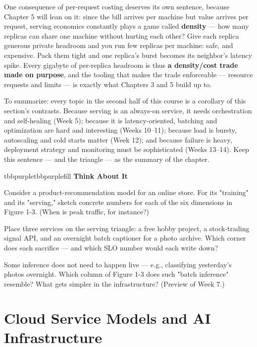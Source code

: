 One consequence of per-request costing deserves its own sentence, because Chapter 5 will lean on it: since the bill arrives per machine but value arrives per request, serving economics constantly plays a game called \textbf{density} — how many replicas can share one machine without hurting each other? Give each replica generous private headroom and you run few replicas per machine: safe, and expensive. Pack them tight and one replica's burst becomes its neighbor's latency spike. Every gigabyte of per-replica headroom is thus \textbf{a density/cost trade made on purpose}, and the tooling that makes the trade enforceable — resource requests and limits — is exactly what Chapters 3 and 5 build up to.

To summarize: every topic in the second half of this course is a corollary of this section's contrasts. Because serving is an always-on service, it needs orchestration and self-healing (Week 5); because it is latency-oriented, batching and optimization are hard and interesting (Weeks 10–11); because load is bursty, autoscaling and cold starts matter (Week 12); and because failure is heavy, deployment strategy and monitoring must be sophisticated (Weeks 13–14). Keep this sentence — and the triangle — as the summary of the chapter.

\begin{calloutbox}{tbbpurple}{tbbpurplefill}
{\normalsize\bfseries\color{tbbpurple}Think About It}\par\vspace{3pt}
\begin{tbbitemize}
  \item Consider a product-recommendation model for an online store. For its "training" and its "serving," sketch concrete numbers for each of the six dimensions in Figure 1-3. (When is peak traffic, for instance?)
  \item Place three services on the serving triangle: a free hobby project, a stock-trading signal API, and an overnight batch captioner for a photo archive. Which corner does each sacrifice — and which SLO number would each write down?
  \item Some inference does not need to happen live — e.g., classifying yesterday's photos overnight. Which column of Figure 1-3 does such "batch inference" resemble? What gets simpler in the infrastructure? (Preview of Week 7.)
\end{tbbitemize}
\end{calloutbox}

\section{Cloud Service Models and AI Infrastructure}

